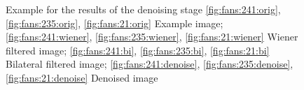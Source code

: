 \documentclass[draft,final]{vutinfth} %
\begin{document}
{\begin{figure}[H]

\caption{Example for the results of the denoising stage
				\ref{fig:fans:241:orig}, \ref{fig:fans:235:orig}, \ref{fig:fans:21:orig} Example image; \ref{fig:fans:241:wiener}, \ref{fig:fans:235:wiener}, \ref{fig:fans:21:wiener} Wiener filtered image; \ref{fig:fans:241:bi}, \ref{fig:fans:235:bi}, \ref{fig:fans:21:bi} Bilateral filtered image; \ref{fig:fans:241:denoise}, \ref{fig:fans:235:denoise}, \ref{fig:fans:21:denoise} Denoised image}
\label{fig:fans:denoise}

\end{figure}
}
\end{document}
